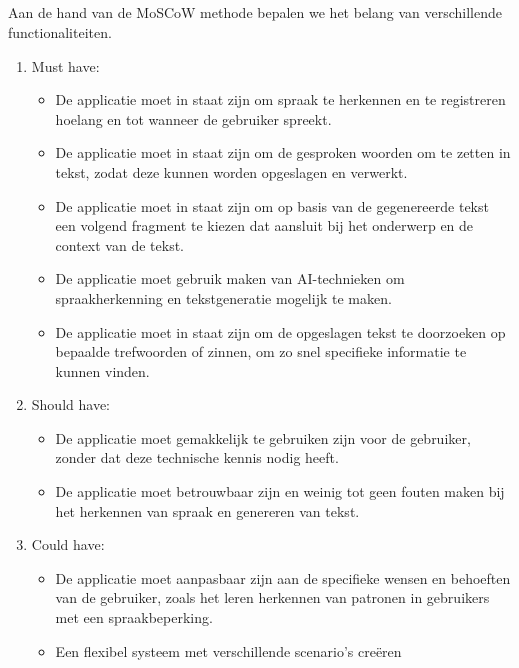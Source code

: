 \subsection{}%

Aan de hand van de MoSCoW methode bepalen we het belang van verschillende functionaliteiten.

\begin{enumerate}
    \item Must have:
    \begin{itemize}
        \item  De applicatie moet in staat zijn om spraak te herkennen en te registreren hoelang en tot wanneer de gebruiker spreekt.
        \item De applicatie moet in staat zijn om de gesproken woorden om te zetten in tekst, zodat deze kunnen worden opgeslagen en verwerkt.
        \item De applicatie moet in staat zijn om op basis van de gegenereerde tekst een volgend fragment te kiezen dat aansluit bij het onderwerp en de context van de tekst.
        \item De applicatie moet gebruik maken van AI-technieken om spraakherkenning en tekstgeneratie mogelijk te maken.
        \item  De applicatie moet in staat zijn om de opgeslagen tekst te doorzoeken op bepaalde trefwoorden of zinnen, om zo snel specifieke informatie te kunnen vinden.
    \end{itemize}
    \item Should have:
    \begin{itemize}
        \item De applicatie moet gemakkelijk te gebruiken zijn voor de gebruiker, zonder dat deze technische kennis nodig heeft.
        \item De applicatie moet betrouwbaar zijn en weinig tot geen fouten maken bij het herkennen van spraak en genereren van tekst.
    \end{itemize}
    \item Could have:
    \begin{itemize}
        \item De applicatie moet aanpasbaar zijn aan de specifieke wensen en behoeften van de gebruiker, zoals het leren herkennen van patronen in gebruikers met een spraakbeperking.
        \item Een flexibel systeem met verschillende scenario’s creëren
    \end{itemize}
\end{enumerate}

